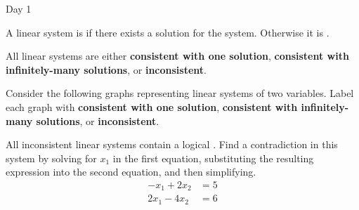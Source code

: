 \begin{applicationActivities}{Day 1}
\begin{definition}
  A linear system is  if there exists a solution for the
  system. Otherwise it is .
\end{definition}

\begin{fact}
  All linear systems are either \textbf{consistent with one solution},
  \textbf{consistent with infinitely-many solutions}, or
  \textbf{inconsistent}.
\end{fact}

\begin{activity}{5}
  Consider the following graphs representing linear systems of two variables.
  Label each graph with \textbf{consistent with one solution},
  \textbf{consistent with infinitely-many solutions}, or
  \textbf{inconsistent}.
  \begin{multicols}{4}
  \begin{center}
    \systemWithInfinitelyManySolutions
    \systemWithOneSolutionB
    \systemWithNoSolutions
    \systemWithOneSolutionA
  \end{center}
  \end{multicols}
\end{activity}

\begin{activity}{10}
  All inconsistent linear systems contain a logical .
  Find a contradiction in this system by solving for \(x_1\) in the first
  equation, substituting the resulting expression into the
  second equation, and then simplifying.
  \begin{align*}
  -x_1+2x_2  &=  5 \\
  2x_1-4x_2  &=  6
  \end{align*}
\end{activity}


\end{applicationActivities}
